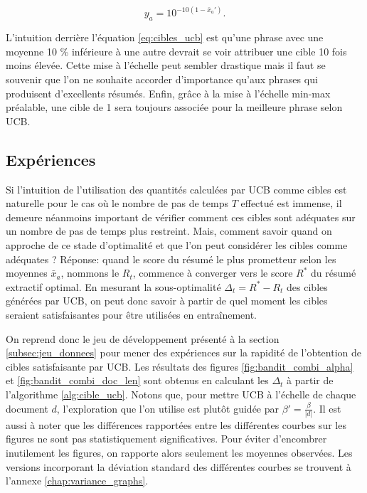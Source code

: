 \begin{equation}
    y_a = 10^{-10(1 - \bar{x}_a')}.
    \label{eq:cibles_ucb}
\end{equation}

L'intuition derrière l'équation \eqref{eq:cibles_ucb} est qu'une phrase 
avec une moyenne 10 \% inférieure à une autre devrait se voir attribuer une cible 
10 fois moins élevée. 
Cette mise à l'échelle peut sembler drastique mais il faut se souvenir 
que l'on ne souhaite accorder d'importance qu'aux phrases qui produisent 
d'excellents résumés.
Enfin, grâce à la mise à l'échelle min-max préalable, une cible de 1 
sera toujours associée pour la meilleure phrase selon UCB.

\subsection{Expériences}

Si l'intuition de l'utilisation des quantités calculées par UCB comme cibles est naturelle
pour le cas où le nombre de pas de temps $T$ effectué est immense, il demeure néanmoins important
de vérifier comment ces cibles sont adéquates sur un nombre de pas de temps plus restreint.
Mais, comment savoir quand on approche de ce stade d'optimalité et que 
l'on peut considérer les cibles comme adéquates ?
Réponse: quand le score du résumé le plus prometteur selon les moyennes $\bar{x}_a$, nommons le $R_t$,
commence à converger vers le score $R^*$ du résumé extractif optimal.
En mesurant la sous-optimalité $\Delta_t = R^* - R_t$ des cibles générées
par UCB, on peut donc savoir à partir de quel moment les cibles seraient satisfaisantes
pour être utilisées en entraînement.

On reprend donc le jeu de développement présenté à la section \ref{subsec:jeu_donnees} 
pour mener des expériences sur la rapidité de l'obtention de cibles satisfaisante par UCB.
Les résultats des figures \ref{fig:bandit_combi_alpha}
et \ref{fig:bandit_combi_doc_len} sont obtenus en calculant les $\Delta_t$ à partir de
l'algorithme \ref{alg:cible_ucb}.
Notons que, pour mettre UCB à l'échelle de chaque document $d$, 
l'exploration que l'on utilise est plutôt guidée par $\beta' = \frac{\beta}{|d|}$.
Il est aussi à noter que les différences rapportées entre les différentes 
courbes sur les figures ne sont pas statistiquement significatives.
Pour éviter d'encombrer inutilement les figures, on rapporte alors 
seulement les moyennes observées.
Les versions incorporant la déviation standard des différentes courbes 
se trouvent à l'annexe \ref{chap:variance_graphs}.

